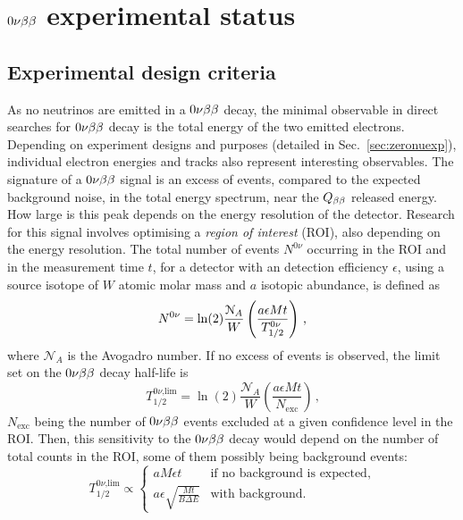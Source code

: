 \section{$0\nu\beta\beta$ experimental status}
\label{sec:0nu_exp}

\subsection{Experimental design criteria}

As no neutrinos are emitted in a $0\nu\beta\beta$ decay, the minimal observable in direct searches for $0\nu\beta\beta$ decay is the total energy of the two emitted electrons.
Depending on experiment designs and purposes (detailed in Sec.~\ref{sec:zeronuexp}), individual electron energies and tracks also represent interesting observables.
The signature of a $0\nu\beta\beta$ signal is an excess of events, compared to the expected background noise, in the total energy spectrum, near the $Q_{\beta\beta}$ released energy.
How large is this peak depends on the energy resolution of the detector.
Research for this signal involves optimising a \emph{region of interest} (ROI), also depending on the energy resolution.
The total number of events $N^{0\nu}$ occurring in the ROI and in the measurement time $t$, for a detector with an detection efficiency $\epsilon$, using a source isotope of $W$ atomic molar mass and $a$ isotopic abundance, is defined as
\begin{equation}
  N^{0\nu}=\ln(2)\frac{\mathcal{N}_{A}}{W}\left(\frac{a\epsilon M t}{T_{1/2}^{0\nu}}\right)\,\text{,}
  \label{eq:Nevents}
\end{equation}
where $\mathcal{N}_{A}$ is the Avogadro number.
If no excess of events is observed, the limit set on the $0\nu\beta\beta$ decay half-life is
\begin{equation}
  T_{1/2}^{0\nu\text{,lim}}=\ln(2)\frac{\mathcal{N}_{A}}{W}\left(\frac{a\epsilon M t}{N_{\text{exc}}}\right)\,\text{,}
  \label{eq:Tlim}
\end{equation}
$N_{\text{exc}}$ being the number of $0\nu\beta\beta$ events excluded at a given confidence level in the ROI.
Then, this sensitivity to the $0\nu\beta\beta$ decay would depend on the number of total counts in the ROI, some of them possibly being background events:
\begin{equation}
  T_{1/2}^{0\nu\text{,lim}} \propto \left\{
  \begin{array}{ll}
    a M \epsilon t & \text{if no background is expected,} \\
    a \epsilon \sqrt{\frac{M t}{B \Delta E}} & \text{with background.}
  \end{array}
  \right.
  \label{eq:sensitivity_background}
\end{equation}
